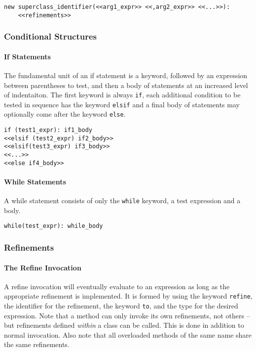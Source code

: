 \begin{lstlisting}
new superclass_identifier(<<arg1_expr>> <<,arg2_expr>> <<...>>):
    <<refinements>>
\end{lstlisting}

\subsubsection{Conditional Structures}
\paragraph{If Statements}
The fundamental unit of an if statement is a keyword, followed by an expression between parentheses to test, and then a body of statements at an increased level of indentaiton. The first keyword is always \verb!if!, each additional condition to be tested in sequence has the keyword \verb!elsif! and a final body of statements may optionally come after the keyword \verb!else!.

\begin{lstlisting}
if (test1_expr): if1_body
<<elsif (test2_expr) if2_body>>
<<elsif(test3_expr) if3_body>>
<<...>>
<<else if4_body>>
\end{lstlisting}

\paragraph{While Statements}
A while statement consists of only the \verb!while! keyword, a test expression and a body.

\begin{lstlisting}
while(test_expr): while_body
\end{lstlisting}

\subsubsection{Refinements}
\paragraph{The Refine Invocation}
A refine invocation will eventually evaluate to an expression as long as the appropriate refinement is implemented. It is formed by using the keyword \verb!refine!, the identifier for the refinement, the keyword \verb!to!, and the type for the desired expression. Note that a method can only invoke its own refinements, not others -- but refinements defined \emph{within} a class can be called. This is done in addition to normal invocation. Also note that all overloaded methods of the same name share the same refinements.

